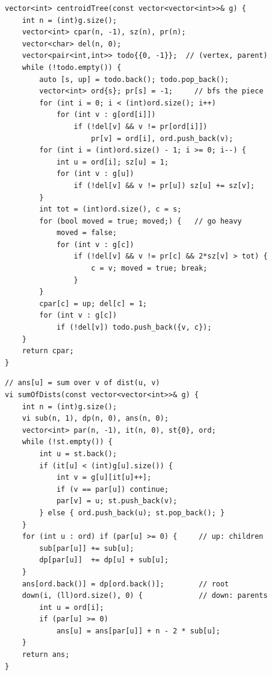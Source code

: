 \begin{lstlisting}
vector<int> centroidTree(const vector<vector<int>>& g) {
    int n = (int)g.size();
    vector<int> cpar(n, -1), sz(n), pr(n);
    vector<char> del(n, 0);
    vector<pair<int,int>> todo{{0, -1}};  // (vertex, parent)
    while (!todo.empty()) {
        auto [s, up] = todo.back(); todo.pop_back();
        vector<int> ord{s}; pr[s] = -1;     // bfs the piece
        for (int i = 0; i < (int)ord.size(); i++)
            for (int v : g[ord[i]])
                if (!del[v] && v != pr[ord[i]])
                    pr[v] = ord[i], ord.push_back(v);
        for (int i = (int)ord.size() - 1; i >= 0; i--) {
            int u = ord[i]; sz[u] = 1;
            for (int v : g[u])
                if (!del[v] && v != pr[u]) sz[u] += sz[v];
        }
        int tot = (int)ord.size(), c = s;
        for (bool moved = true; moved;) {   // go heavy
            moved = false;
            for (int v : g[c])
                if (!del[v] && v != pr[c] && 2*sz[v] > tot) {
                    c = v; moved = true; break;
                }
        }
        cpar[c] = up; del[c] = 1;
        for (int v : g[c])
            if (!del[v]) todo.push_back({v, c});
    }
    return cpar;
}
\end{lstlisting}


\begin{lstlisting}
// ans[u] = sum over v of dist(u, v)
vi sumOfDists(const vector<vector<int>>& g) {
    int n = (int)g.size();
    vi sub(n, 1), dp(n, 0), ans(n, 0);
    vector<int> par(n, -1), it(n, 0), st{0}, ord;
    while (!st.empty()) {
        int u = st.back();
        if (it[u] < (int)g[u].size()) {
            int v = g[u][it[u]++];
            if (v == par[u]) continue;
            par[v] = u; st.push_back(v);
        } else { ord.push_back(u); st.pop_back(); }
    }
    for (int u : ord) if (par[u] >= 0) {     // up: children
        sub[par[u]] += sub[u];
        dp[par[u]]  += dp[u] + sub[u];
    }
    ans[ord.back()] = dp[ord.back()];        // root
    down(i, (ll)ord.size(), 0) {             // down: parents
        int u = ord[i];
        if (par[u] >= 0)
            ans[u] = ans[par[u]] + n - 2 * sub[u];
    }
    return ans;
}
\end{lstlisting}

